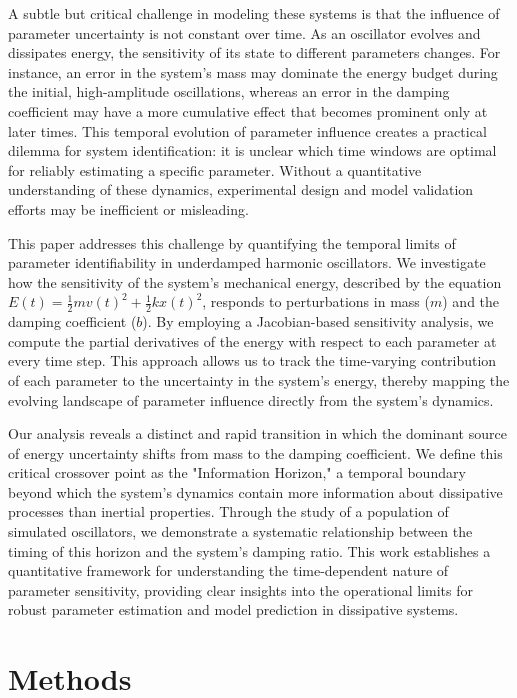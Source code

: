 \documentclass[]{article}
\begin{document}
A subtle but critical challenge in modeling these systems is that the influence of parameter uncertainty is not constant over time. As an oscillator evolves and dissipates energy, the sensitivity of its state to different parameters changes. For instance, an error in the system's mass may dominate the energy budget during the initial, high-amplitude oscillations, whereas an error in the damping coefficient may have a more cumulative effect that becomes prominent only at later times. This temporal evolution of parameter influence creates a practical dilemma for system identification: it is unclear which time windows are optimal for reliably estimating a specific parameter. Without a quantitative understanding of these dynamics, experimental design and model validation efforts may be inefficient or misleading.

This paper addresses this challenge by quantifying the temporal limits of parameter identifiability in underdamped harmonic oscillators. We investigate how the sensitivity of the system's mechanical energy, described by the equation $E(t) = \frac{1}{2} m v(t)^2 + \frac{1}{2} k x(t)^2$, responds to perturbations in mass ($m$) and the damping coefficient ($b$). By employing a Jacobian-based sensitivity analysis, we compute the partial derivatives of the energy with respect to each parameter at every time step. This approach allows us to track the time-varying contribution of each parameter to the uncertainty in the system's energy, thereby mapping the evolving landscape of parameter influence directly from the system's dynamics.

Our analysis reveals a distinct and rapid transition in which the dominant source of energy uncertainty shifts from mass to the damping coefficient. We define this critical crossover point as the "Information Horizon," a temporal boundary beyond which the system's dynamics contain more information about dissipative processes than inertial properties. Through the study of a population of simulated oscillators, we demonstrate a systematic relationship between the timing of this horizon and the system's damping ratio. This work establishes a quantitative framework for understanding the time-dependent nature of parameter sensitivity, providing clear insights into the operational limits for robust parameter estimation and model prediction in dissipative systems.

\section{Methods}
\label{sec:methods}
\end{document}
